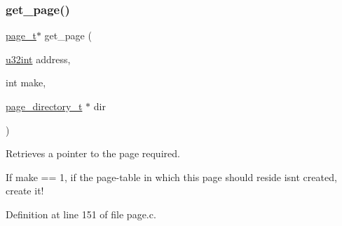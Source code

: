 \subsubsection{\texorpdfstring{get\+\_\+page()}{get\_page()}}
{\footnotesize\ttfamily \hyperlink{a00116_a76113662e059e0926a92c5b15c098f4a_a76113662e059e0926a92c5b15c098f4a}{page\+\_\+t}$\ast$ get\+\_\+page (\begin{DoxyParamCaption}\item[{\hyperlink{a00134_a7ae3a26c17ddfe117c6291739780801d_a7ae3a26c17ddfe117c6291739780801d}{u32int}}]{address,  }\item[{int}]{make,  }\item[{\hyperlink{a00116_aa6e79064ffe1eb8c43be4dc1be3f64a1_aa6e79064ffe1eb8c43be4dc1be3f64a1}{page\+\_\+directory\+\_\+t} $\ast$}]{dir }\end{DoxyParamCaption})}



Retrieves a pointer to the page required. 

If make == 1, if the page-\/table in which this page should reside isn\textquotesingle{}t created, create it! 

Definition at line 151 of file page.\+c.


